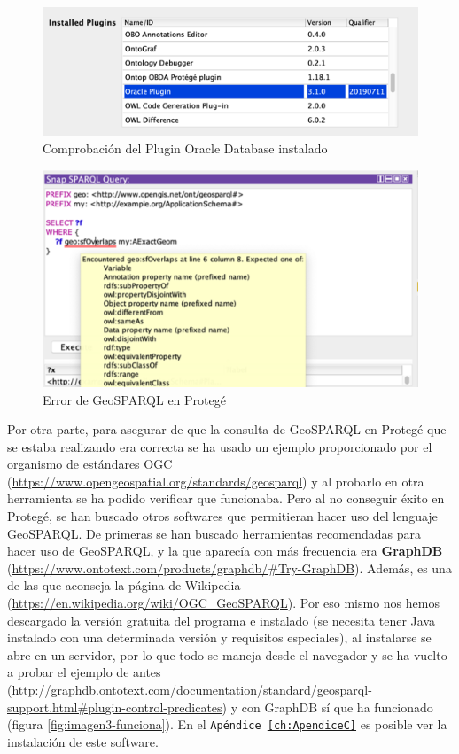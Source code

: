 \begin{figure}[H]
	\centering
	\includegraphics[width=0.8\linewidth]{imagenes/apendices/Imagen1}
	\caption{Comprobación del Plugin Oracle Database instalado}
	\label{fig:imagen1-comprobar}
\end{figure}

\begin{figure}[H]
	\centering
	\includegraphics[width=0.85\linewidth]{imagenes/apendices/Imagen2}
	\caption{Error de GeoSPARQL en Protegé}
	\label{fig:imagen2-error}
\end{figure}

Por otra parte, para asegurar de que la consulta de GeoSPARQL en Protegé que se estaba realizando era correcta se ha usado un ejemplo proporcionado por el organismo de estándares OGC (\url{https://www.opengeospatial.org/standards/geosparql}) y al probarlo en otra herramienta se ha podido verificar que funcionaba. Pero al no conseguir éxito en Protegé, se han buscado otros softwares que permitieran hacer uso del lenguaje GeoSPARQL. De primeras se han buscado herramientas recomendadas para hacer uso de GeoSPARQL, y la que aparecía con más frecuencia era \textbf{GraphDB} (\url{https://www.ontotext.com/products/graphdb/#Try-GraphDB}). Además, es una de las que aconseja la página de Wikipedia (\url{https://en.wikipedia.org/wiki/OGC_GeoSPARQL}). Por eso mismo nos hemos descargado la versión gratuita del programa e instalado (se necesita tener Java instalado con una determinada versión y requisitos especiales), al instalarse se abre en un servidor, por lo que todo se maneja desde el navegador y se ha vuelto a probar el ejemplo de antes (\url{http://graphdb.ontotext.com/documentation/standard/geosparql-support.html#plugin-control-predicates}) y con GraphDB sí que ha funcionado (figura \ref{fig:imagen3-funciona}). En el \texttt{Apéndice \ref{ch:ApendiceC}} es posible ver la instalación de este software.

